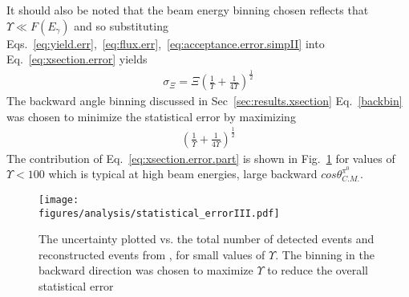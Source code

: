 It should also be noted that the beam energy binning chosen reflects that $\Upsilon \ll F(E_\gamma)$ and so substituting Eqs.~\ref{eq:yield.err},~\ref{eq:flux.err},~\ref{eq:acceptance.error.simpII} into Eq.~\ref{eq:xsection.error} yields
\begin{align}
\sigma_\varXi = \varXi \left(\frac{1}{\Upsilon} +\frac{1}{4\Upsilon}\right)^{\frac{1}{2}}\label{eq:xsection.error.part1}
\end{align}
The backward angle binning discussed in Sec~\ref{sec:results.xsection} Eq.~\ref{backbin} was chosen to minimize the statistical error by maximizing 
\begin{align}
\left(\frac{1}{\Upsilon} +\frac{1}{4\Upsilon}\right)^{\frac{1}{2}}\label{eq:xsection.error.part}
\end{align}
The contribution of Eq.~\ref{eq:xsection.error.part} is shown in Fig.~\ref{fig:results.staterr} for values of $\Upsilon < 100$ which is typical at high beam energies, large backward $cos\theta^{\pi^0}_{C.M.}$.

\begin{figure}[h!]\begin{center}
\texttt{[image: \\figures/analysis/statistical\_errorIII.pdf]}
\caption[The uncertainty plotted vs. the total number of detected events and reconstructed events from , for small values of $\Upsilon$]{\label{fig:results.staterr}The uncertainty plotted vs. the total number of detected events and reconstructed events from , for small values of $\Upsilon$. The binning in the backward direction was chosen to maximize $\Upsilon$ to reduce the overall statistical error }
\end{center}\end{figure}

\FloatBarrier